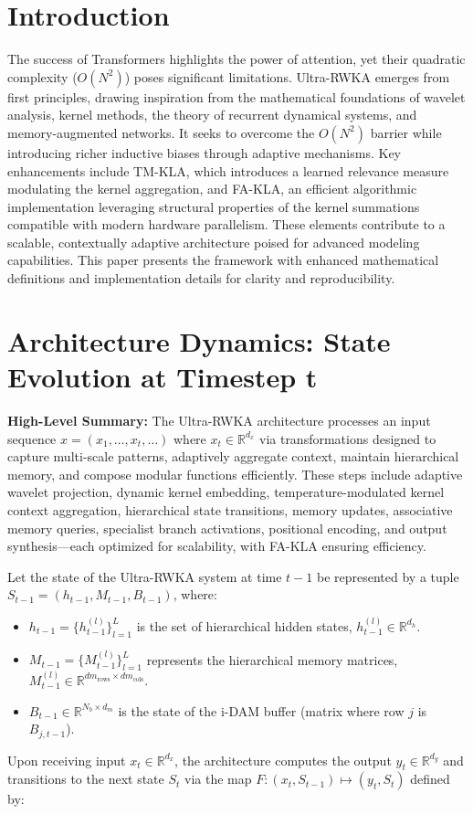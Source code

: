 \documentclass{article}
\begin{document}
\section{Introduction}
The success of Transformers highlights the power of attention, yet their quadratic complexity ($O(N^2)$) poses significant limitations. Ultra-RWKA emerges from first principles, drawing inspiration from the mathematical foundations of wavelet analysis, kernel methods, the theory of recurrent dynamical systems, and memory-augmented networks. It seeks to overcome the $O(N^2)$ barrier while introducing richer inductive biases through adaptive mechanisms. Key enhancements include TM-KLA, which introduces a learned relevance measure modulating the kernel aggregation, and FA-KLA, an efficient algorithmic implementation leveraging structural properties of the kernel summations compatible with modern hardware parallelism. These elements contribute to a scalable, contextually adaptive architecture poised for advanced modeling capabilities. This paper presents the framework with enhanced mathematical definitions and implementation details for clarity and reproducibility.

\section{Architecture Dynamics: State Evolution at Timestep t}
\textbf{High-Level Summary:} The Ultra-RWKA architecture processes an input sequence $x = (x_1, \dots, x_t, \dots)$ where $x_t \in \mathbb{R}^{d_x}$ via transformations designed to capture multi-scale patterns, adaptively aggregate context, maintain hierarchical memory, and compose modular functions efficiently. These steps include adaptive wavelet projection, dynamic kernel embedding, temperature-modulated kernel context aggregation, hierarchical state transitions, memory updates, associative memory queries, specialist branch activations, positional encoding, and output synthesis—each optimized for scalability, with FA-KLA ensuring efficiency.

Let the state of the Ultra-RWKA system at time $t-1$ be represented by a tuple $S_{t-1} = (h_{t-1}, M_{t-1}, B_{t-1})$, where:
\begin{itemize}
    \item $h_{t-1} = \{h_{t-1}^{(l)}\}_{l=1}^L$ is the set of hierarchical hidden states, $h_{t-1}^{(l)} \in \mathbb{R}^{d_h}$.
    \item $M_{t-1} = \{M_{t-1}^{(l)}\}_{l=1}^L$ represents the hierarchical memory matrices, $M_{t-1}^{(l)} \in \mathbb{R}^{d m_{\text{rows}} \times d m_{\text{cols}}}$. %
    \item $B_{t-1} \in \mathbb{R}^{N_b \times d_m}$ is the state of the i-DAM buffer (matrix where row $j$ is $B_{j,t-1}$).
\end{itemize}
Upon receiving input $x_t \in \mathbb{R}^{d_x}$, the architecture computes the output $y_t \in \mathbb{R}^{d_y}$ and transitions to the next state $S_t$ via the map $F:(x_t, S_{t-1}) \mapsto (y_t, S_t)$ defined by:
\end{document}
